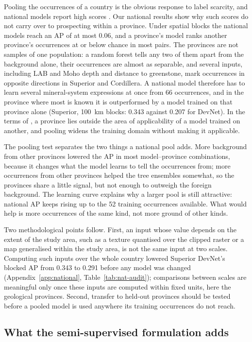 \documentclass[pdflatex,sn-apa]{sn-jnl}
\begin{document}
Pooling the occurrences of a country is the obvious response to label scarcity, and national models report high scores \citep{Parsa2024}. Our national results show why such scores do not carry over to prospecting within a province. Under spatial blocks the national models reach an AP of at most 0.06, and a province's model ranks another province's occurrences at or below chance in most pairs. The provinces are not samples of one population: a random forest tells any two of them apart from the background alone, their occurrences are almost as separable, and several inputs, including LAB and Moho depth and distance to greenstone, mark occurrences in opposite directions in Superior and Cordillera. A national model therefore has to learn several mineral-system expressions at once from 66 occurrences, and in the province where most is known it is outperformed by a model trained on that province alone (Superior, 100~km blocks: 0.343 against 0.207 for DevNet). In the terms of \citet{Meyer2021}, a province lies outside the area of applicability of a model trained on another, and pooling widens the training domain without making it applicable.

The pooling test separates the two things a national pool adds. More background from other provinces lowered the AP in most model--province combinations, because it changes what the model learns to tell the occurrences from; more occurrences from other provinces helped the tree ensembles somewhat, so the provinces share a little signal, but not enough to outweigh the foreign background. The learning curve explains why a larger pool is still attractive: national AP keeps rising up to the 52 training occurrences available. What would help is more occurrences of the same kind, not more ground of other kinds.

Two methodological points follow. First, an input whose value depends on the extent of the study area, such as a texture quantised over the clipped raster or a map generalised within the study area, is not the same input at two scales. Computing such inputs over the whole country lowered Superior DevNet's blocked AP from 0.343 to 0.291 before any model was changed (Appendix~\ref{app:national}, Table~\ref{tab:nat-audit}); comparisons between scales are meaningful only once these inputs are computed within fixed units, here the geological provinces. Second, transfer to held-out provinces should be tested before a pooled model is used anywhere its training occurrences do not reach.

\subsection{What the semi-supervised formulation adds}\label{sec:disc-devnet}
\end{document}
